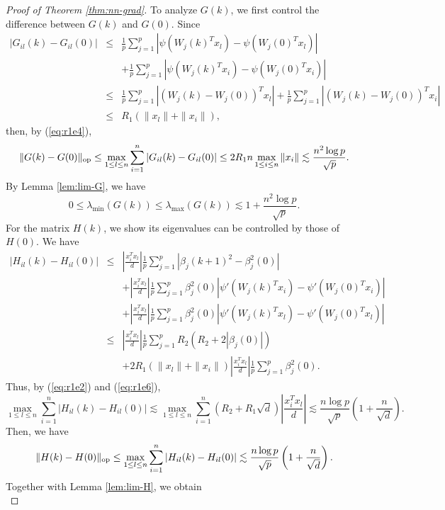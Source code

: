 \begin{proof}[Proof of Theorem \ref{thm:nn-grad}]
To analyze $G(k)$, we first control the difference between $G(k)$ and $G(0)$. Since
\begin{eqnarray*}
|G_{il}(k) - G_{il}(0)| &\leq& \frac{1}{p}\sum_{j=1}^p|\psi(W_j(k)^Tx_l) - \psi(W_j(0)^Tx_l)| \\
&& + \frac{1}{p}\sum_{j=1}^p|\psi(W_j(k)^Tx_i) - \psi(W_j(0)^Tx_i)| \\
&\leq& \frac{1}{p}\sum_{j=1}^p|(W_j(k)-W_j(0))^Tx_l| + \frac{1}{p}\sum_{j=1}^p|(W_j(k)-W_j(0))^Tx_i| \\
&\leq& R_1\left(\|x_l\| + \|x_i\|\right),
\end{eqnarray*}
then, by (\ref{eq:r1e4}),
\begin{equation}
\opnorm{G(k)-G(0)}\leq\max_{1\leq l\leq n}\sum_{i=1}^n|G_{il}(k) - G_{il}(0)|\leq 2R_1n\max_{1\leq i\leq n}\|x_i\|\lesssim \frac{n^2\log p}{\sqrt{p}}. \label{eq:x-japan}
\end{equation}
By Lemma \ref{lem:lim-G}, we have
\begin{equation}
0 \leq \lambda_{\min}(G(k)) \leq \lambda_{\max}(G(k)) \lesssim 1+\frac{n^2\log p}{\sqrt{p}}. \label{eq:Gk-spec-arctan}
\end{equation}
For the matrix $H(k)$, we show its eigenvalues can be controlled by those of $H(0)$. We have
\begin{eqnarray*}
|H_{il}(k)-H_{il}(0)| &\leq& \left|\frac{x_i^Tx_l}{d}\right|\frac{1}{p}\sum_{j=1}^p|\beta_j(k+1)^2-\beta_j^2(0)| \\
&& + \left|\frac{x_i^Tx_l}{d}\right|\frac{1}{p}\sum_{j=1}^p\beta_j^2(0)|\psi'(W_j(k)^Tx_i) - \psi'(W_j(0)^Tx_i)| \\
&& + \left|\frac{x_i^Tx_l}{d}\right|\frac{1}{p}\sum_{j=1}^p\beta_j^2(0)|\psi'(W_j(k)^Tx_l) - \psi'(W_j(0)^Tx_l)| \\
&\leq& \left|\frac{x_i^Tx_l}{d}\right|\frac{1}{p}\sum_{j=1}^pR_2(R_2+2|\beta_j(0)|) \\
&& + 2R_1\left(\|x_l\| + \|x_i\|\right)\left|\frac{x_i^Tx_l}{d}\right|\frac{1}{p}\sum_{j=1}^p\beta_j^2(0).
\end{eqnarray*}
Thus, by (\ref{eq:r1e2}) and (\ref{eq:r1e6}),
$$\max_{1\leq l\leq n}\sum_{i=1}^n|H_{il}(k) - H_{il}(0)|\lesssim \max_{1\leq l\leq n}\sum_{i=1}^n(R_2+R_1\sqrt{d})\left|\frac{x_i^Tx_l}{d}\right|\lesssim \frac{n\log p}{\sqrt{p}}\left(1+\frac{n}{\sqrt{d}}\right).$$
Then, we have
$$
\|H(k)-H(0)\|_{\rm op}\leq \max_{1\leq l\leq n}\sum_{i=1}^n|H_{il}(k) - H_{il}(0)|\lesssim \frac{n\log p}{\sqrt{p}}\left(1+\frac{n}{\sqrt{d}}\right).
$$
Together with Lemma \ref{lem:lim-H}, we obtain
\begin{equation}

\end{equation}
\end{proof}
